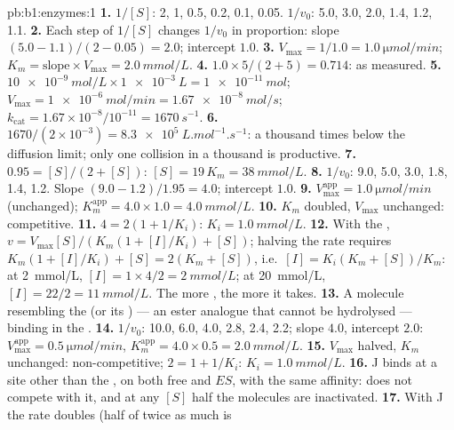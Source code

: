 \begin{solution}{pb:b1:enzymes:1}
\textbf{1.} $1/[S]$: 2, 1, 0.5, 0.2, 0.1, 0.05. $1/v_0$: 5.0, 3.0, 2.0,
1.4, 1.2, 1.1.
\textbf{2.} Each step of $1/[S]$ changes $1/v_0$ in proportion: slope
$(5.0 - 1.1)/(2 - 0.05) = 2.0$; intercept $1.0$.
\textbf{3.} $V_{\max} = 1/1.0 = \qty{1.0}{\micro mol/min}$; $K_m =
\text{slope}\times V_{\max} = \qty{2.0}{mmol/L}$.
\textbf{4.} $1.0\times 5/(2 + 5) = 0.714$: as measured.
\textbf{5.} $\qty{10e-9}{mol/L}\times\qty{1e-3}{L} = \qty{1e-11}{mol}$;
$V_{\max} = \qty{1e-6}{mol/min} = \qty{1.67e-8}{mol/s}$;
$k_{\text{cat}} = 1.67\times 10^{-8}/10^{-11} = \qty{1670}{s^{-1}}$.
\textbf{6.} $1670/(2\times 10^{-3}) = \qty{8.3e5}{L.mol^{-1}.s^{-1}}$:
a thousand times below the diffusion limit; only one collision in a
thousand is productive.
\textbf{7.} $0.95 = [S]/(2 + [S])$: $[S] = 19\,K_m = \qty{38}{mmol/L}$.
\textbf{8.} $1/v_0$: 9.0, 5.0, 3.0, 1.8, 1.4, 1.2. Slope $(9.0 -
1.2)/1.95 = 4.0$; intercept $1.0$.
\textbf{9.} $V_{\max}^{\text{app}} = \qty{1.0}{\micro mol/min}$
(unchanged); $K_m^{\text{app}} = 4.0\times 1.0 = \qty{4.0}{mmol/L}$.
\textbf{10.} $K_m$ doubled, $V_{\max}$ unchanged: competitive.
\textbf{11.} $4 = 2(1 + 1/K_i)$: $K_i = \qty{1.0}{mmol/L}$.
\textbf{12.} With the , $v = V_{\max}[S]/(K_m(1 + [I]/K_i) +
[S])$; halving the rate requires $K_m(1 + [I]/K_i) + [S] = 2(K_m +
[S])$, i.e.\ $[I] = K_i(K_m + [S])/K_m$: at \qty{2}{mmol/L}, $[I] =
1\times 4/2 = \qty{2}{mmol/L}$; at \qty{20}{mmol/L}, $[I] = 22/2 =
\qty{11}{mmol/L}$. The more , the more  it takes.
\textbf{13.} A molecule resembling the  (or its ) --- an ester analogue that cannot be hydrolysed --- binding in
the .
\textbf{14.} $1/v_0$: 10.0, 6.0, 4.0, 2.8, 2.4, 2.2; slope $4.0$,
intercept $2.0$: $V_{\max}^{\text{app}} = \qty{0.5}{\micro mol/min}$,
$K_m^{\text{app}} = 4.0\times 0.5 = \qty{2.0}{mmol/L}$.
\textbf{15.} $V_{\max}$ halved, $K_m$ unchanged: non-competitive;
$2 = 1 + 1/K_i$: $K_i = \qty{1.0}{mmol/L}$.
\textbf{16.} J binds at a site other than the , on both
free  and $ES$, with the same affinity:  does not
compete with it, and at any $[S]$ half the  molecules are
inactivated.
\textbf{17.} With J the rate doubles (half of twice as much  is

\end{solution}
